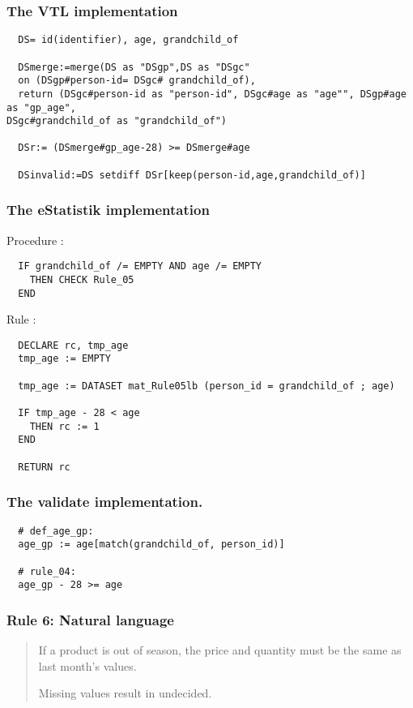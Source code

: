 \subsubsection*{The VTL implementation}
\begin{verbatim}
  DS= id(identifier), age, grandchild_of

  DSmerge:=merge(DS as "DSgp",DS as "DSgc"
  on (DSgp#person-id= DSgc# grandchild_of),
  return (DSgc#person-id as "person-id", DSgc#age as "age"", DSgp#age as "gp_age",
DSgc#grandchild_of as "grandchild_of")

  DSr:= (DSmerge#gp_age-28) >= DSmerge#age

  DSinvalid:=DS setdiff DSr[keep(person-id,age,grandchild_of)]

\end{verbatim}
\subsubsection*{The eStatistik implementation}
\noindent
Procedure :
\begin{verbatim}
  IF grandchild_of /= EMPTY AND age /= EMPTY
    THEN CHECK Rule_05
  END
\end{verbatim}
\noindent
Rule :
\begin{verbatim}
  DECLARE rc, tmp_age
  tmp_age := EMPTY

  tmp_age := DATASET mat_Rule05lb (person_id = grandchild_of ; age)

  IF tmp_age - 28 < age
    THEN rc := 1
  END

  RETURN rc
\end{verbatim}

\subsubsection*{The validate implementation.}
\begin{verbatim}
  # def_age_gp:
  age_gp := age[match(grandchild_of, person_id)]

  # rule_04:
  age_gp - 28 >= age
\end{verbatim}


\newpage

\subsubsection*{  Rule 6: Natural language}
\begin{quote}


If a product is out of season, the price and quantity must be the same as last month's values.

Missing values result in undecided.


\end{quote}
